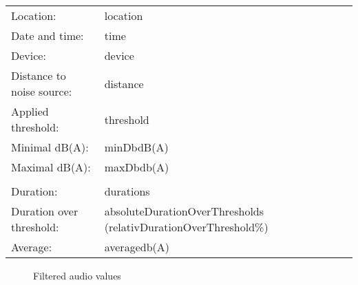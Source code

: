 \documentclass{article}
\begin{document}
\begin{table}[h]
    \centering
    \begin{tabular}{l l}
        Location:  & {{location}}  \\
        Date and time:      & {{time}}      \\
        Device:    & {{device}}    \\
        Distance to noise source:  & {{distance}}  \\
        Applied threshold: & {{threshold}} \\
        Minimal dB(A):     & {{minDb}}dB(A)     \\
        Maximal dB(A):     & {{maxDb}}db(A)     \\
                                        \\
        Duration: & {{duration}}s\\
        Duration over threshold: & {{absoluteDurationOverThreshold}}s ({{relativDurationOverThreshold}}\%) \\
        Average: & {{average}}db(A) \\
    \end{tabular}
    \label{tab:table}
\end{table}

\begin{figure}[h!]
    \begin{center}
        \caption{Filtered audio values}
    \end{center}
    \label{fig:figure}
\end{figure}
\end{document}
